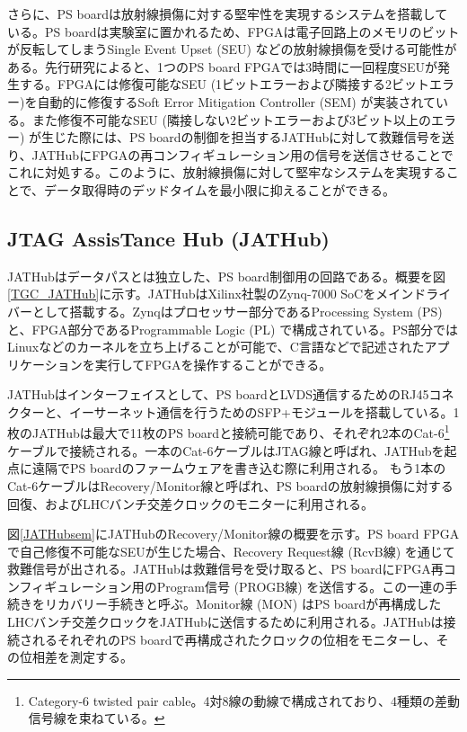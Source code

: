     さらに、PS boardは放射線損傷に対する堅牢性を実現するシステムを搭載している。PS boardは実験室に置かれるため、FPGAは電子回路上のメモリのビットが反転してしまうSingle Event Upset (SEU) などの放射線損傷を受ける可能性がある。先行研究\cite{PSB_SEU}によると、1つのPS board FPGAでは3時間に一回程度SEUが発生する。FPGAには修復可能なSEU  (1ビットエラーおよび隣接する2ビットエラー)を自動的に修復するSoft Error Mitigation Controller  (SEM) が実装されている。また修復不可能なSEU  (隣接しない2ビットエラーおよび3ビット以上のエラー) が生じた際には、PS boardの制御を担当するJATHubに対して救難信号を送り、JATHubにFPGAの再コンフィギュレーション用の信号を送信させることでこれに対処する。このように、放射線損傷に対して堅牢なシステムを実現することで、データ取得時のデッドタイムを最小限に抑えることができる。    

        \subsection*{JTAG AssisTance Hub (JATHub)}
    JATHubはデータパスとは独立した、PS board制御用の回路である。概要を図\ref{TGC_JATHub}に示す。JATHubはXilinx社製のZynq-7000 SoCをメインドライバーとして搭載する。Zynqはプロセッサー部分であるProcessing System  (PS) と、FPGA部分であるProgrammable Logic  (PL) で構成されている。PS部分ではLinuxなどのカーネルを立ち上げることが可能で、C言語などで記述されたアプリケーションを実行してFPGAを操作することができる。

    JATHubはインターフェイスとして、PS boardとLVDS通信するためのRJ45コネクターと、イーサーネット通信を行うためのSFP+モジュールを搭載している。1枚のJATHubは最大で11枚のPS boardと接続可能であり、それぞれ2本のCat-6\footnote{Category-6 twisted pair cable。4対8線の動線で構成されており、4種類の差動信号線を束ねている。}ケーブルで接続される。一本のCat-6ケーブルはJTAG線と呼ばれ、JATHubを起点に遠隔でPS boardのファームウェアを書き込む際に利用される。
    もう1本のCat-6ケーブルはRecovery/Monitor線と呼ばれ、PS boardの放射線損傷に対する回復、およびLHCバンチ交差クロックのモニターに利用される。
    
    図\ref{JATHubsem}にJATHubのRecovery/Monitor線の概要を示す。PS board FPGAで自己修復不可能なSEUが生じた場合、Recovery Request線 (RcvB線) を通じて救難信号が出される。JATHubは救難信号を受け取ると、PS boardにFPGA再コンフィギュレーション用のProgram信号 (PROGB線) を送信する。この一連の手続きをリカバリー手続きと呼ぶ。Monitor線 (MON) はPS boardが再構成したLHCバンチ交差クロックをJATHubに送信するために利用される。JATHubは接続されるそれぞれのPS boardで再構成されたクロックの位相をモニターし、その位相差を測定する。
    
